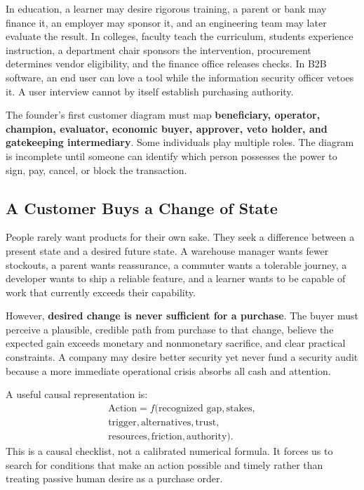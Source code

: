 In education, a learner may desire rigorous training, a parent or bank may finance it, an employer may sponsor it, and an engineering team may later evaluate the result. In colleges, faculty teach the curriculum, students experience instruction, a department chair sponsors the intervention, procurement determines vendor eligibility, and the finance office releases checks. In B2B software, an end user can love a tool while the information security officer vetoes it. A user interview cannot by itself establish purchasing authority.

The founder's first customer diagram must map \textbf{beneficiary, operator, champion, evaluator, economic buyer, approver, veto holder, and gatekeeping intermediary}. Some individuals play multiple roles. The diagram is incomplete until someone can identify which person possesses the power to sign, pay, cancel, or block the transaction.

\subsection{A Customer Buys a Change of State}

People rarely want products for their own sake. They seek a difference between a present state and a desired future state. A warehouse manager wants fewer stockouts, a parent wants reassurance, a commuter wants a tolerable journey, a developer wants to ship a reliable feature, and a learner wants to be capable of work that currently exceeds their capability.

However, \textbf{desired change is never sufficient for a purchase}. The buyer must perceive a plausible, credible path from purchase to that change, believe the expected gain exceeds monetary and nonmonetary sacrifice, and clear practical constraints. A company may desire better security yet never fund a security audit because a more immediate operational crisis absorbs all cash and attention.

A useful causal representation is:
\begin{multline}
\label{eq:action_causal_checklist}
\text{Action} = f\bigl(\text{recognized gap}, \text{stakes}, \\
\text{trigger}, \text{alternatives}, \text{trust}, \\
\text{resources}, \text{friction}, \text{authority}\bigr).
\end{multline}
This is a causal checklist, not a calibrated numerical formula. It forces us to search for conditions that make an action possible and timely rather than treating passive human desire as a purchase order.

